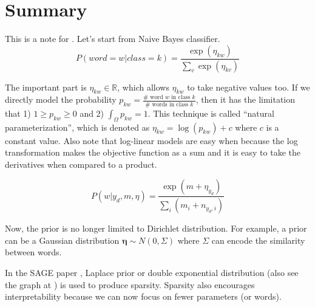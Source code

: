 \documentclass[11pt]{article}
\begin{document}
\section{Summary}

This is a note for \cite{eisenstein2011sparse}.
Let's start from Naive Bayes classifier.
$$
P(word = w|class = k) = \frac{\exp(\eta_{kw})}{\sum_v \exp(\eta_{kv})}
$$

The important part is $\eta_{kw} \in \mathbb{R}$, which allows $\eta_{kw}$ to take negative values too. If we directly model the probability $p_{kw} = \frac{\# \text{ word $w$ in class } k}{\# \text{ words in class } k}$, then it has the limitation that 1) $1 \geq p_{kw} \geq 0$ and 2) $\int_{\Omega} p_{kw} = 1$. This technique is called ``natural parameterization'', which is denoted as $\eta_{kw} = \log(p_{kw}) + c$ where $c$ is a constant value.
Also note that log-linear models are easy when because the log transformation makes the objective function as a sum and it is easy to take the derivatives when compared to a product.



$$
P(w|y_d, m, \eta) = \frac{\exp(m + \eta_{y_d})}{\sum_i (m_i + n_{y_d, i})}
$$

Now, the prior is no longer limited to Dirichlet distribution. For example, a prior can be a Gaussian distribution $\bm{\eta} \sim N(0, \Sigma)$ where $\Sigma$ can encode the similarity between words.

In the SAGE paper \cite{eisenstein2011sparse}, Laplace prior or double exponential distribution (also see the graph at \cite{laplace_prior}) is used to produce sparsity. 
Sparsity also encourages interpretability because we can now focus on fewer parameters (or words).



\end{document}
